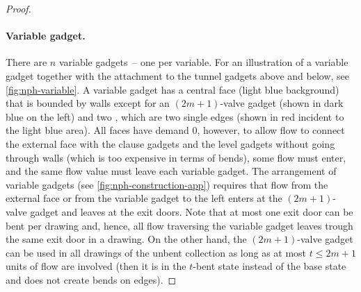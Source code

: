 \documentclass[runningheads]{llncs}
\let\emph\relax\DeclareTextFontCommand{\emph}{\color{dark blue}\em}
\begin{document}
\begin{proof}
    \paragraph{Variable gadget.}
    There are $n$ variable gadgets~-- one per variable.
    For an illustration of a variable gadget together
    with the attachment to the tunnel gadgets above and below, see
    \cref{fig:nph-variable}.
    A variable gadget has a central face (light blue background) that
    is bounded by walls except for an $(2m+1)$-valve gadget (shown in
    dark blue on the left)
    and two \emph{exit doors}, which are two single edges
    (shown in red incident to the light blue area).
    All faces have demand 0, however, to allow flow to connect
    the external face with the clause gadgets and the level gadgets
    without going through walls (which is too expensive in terms of bends),
    some flow must enter, and the same flow value must leave each variable gadget.
    The arrangement of variable gadgets (see \cref{fig:nph-construction-app})
    requires that flow from the external face or from the variable
    gadget to the left enters at the $(2m+1)$-valve gadget and leaves
    at the exit doors.
    Note that at most one exit door can be bent per drawing
    and, hence, all flow traversing the variable gadget leaves
    trough the same exit door in a drawing.
    On the other hand, the $(2m+1)$-valve gadget can be used
    in all drawings of the unbent collection as long
    as at most $t \le 2m + 1$ units of flow are involved
    (then it is in the $t$-bent state instead of the base state
    and does not create bends on edges).
    

\end{proof}
\end{document}
